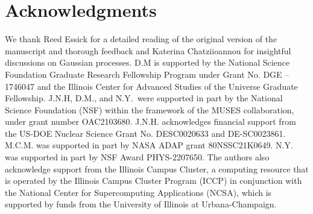 \documentclass[aps,prd,nofootinbib,tightenlines,notitlepage,floatfix,superscriptaddress,showkeys,twocolumn]{revtex4-1}
\begin{document}
\section*{Acknowledgments} 
We thank Reed Essick for a detailed reading of the original version of the manuscript and thorough feedback and Katerina Chatziioannou for insightful discussions on Gaussian processes. D.M is supported by the National Science Foundation Graduate Research Fellowship Program under Grant No. DGE – 1746047 and the Illinois Center for Advanced Studies of the Universe Graduate Fellowship. 
J.N.H, D.M., and N.Y.\ were supported in part by the National Science Foundation (NSF) within the framework
of the MUSES collaboration, under grant number OAC2103680. J.N.H. acknowledges financial support from the US-DOE Nuclear Science Grant
No. DESC0020633 and DE-SC0023861.  M.C.M. was supported in part by NASA ADAP grant 80NSSC21K0649.
N.Y. was supported in part by NSF Award PHYS-2207650.
The authors also acknowledge support
from the Illinois Campus Cluster, a computing resource that
is operated by the Illinois Campus Cluster Program (ICCP)
in conjunction with the National Center for Supercomputing
Applications (NCSA), which is supported by funds from
the University of Illinois at Urbana-Champaign.


\end{document}
